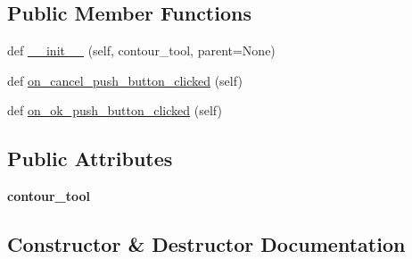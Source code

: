 \subsection*{Public Member Functions}
\begin{DoxyCompactItemize}
\item 
def \mbox{\hyperlink{class_dsg_tools_1_1_production_tools_1_1_contour_tool_1_1contour__value_1_1_contour_value_ad157500a621245f55daf8e2d532efc52}{\+\_\+\+\_\+init\+\_\+\+\_\+}} (self, contour\+\_\+tool, parent=None)
\item 
def \mbox{\hyperlink{class_dsg_tools_1_1_production_tools_1_1_contour_tool_1_1contour__value_1_1_contour_value_ad8b0c9cfb5607c331b648095639bc02a}{on\+\_\+cancel\+\_\+push\+\_\+button\+\_\+clicked}} (self)
\item 
def \mbox{\hyperlink{class_dsg_tools_1_1_production_tools_1_1_contour_tool_1_1contour__value_1_1_contour_value_aa36c4ebedb082e8c01aab94f2d762c2e}{on\+\_\+ok\+\_\+push\+\_\+button\+\_\+clicked}} (self)
\end{DoxyCompactItemize}
\subsection*{Public Attributes}
\begin{DoxyCompactItemize}
\item 
\mbox{\label{class_dsg_tools_1_1_production_tools_1_1_contour_tool_1_1contour__value_1_1_contour_value_a0bf1a3f1dd5d2b6deaac051ad1021c1d}} 
{\bfseries contour\+\_\+tool}
\end{DoxyCompactItemize}


\subsection{Constructor \& Destructor Documentation}
\mbox{\label{class_dsg_tools_1_1_production_tools_1_1_contour_tool_1_1contour__value_1_1_contour_value_ad157500a621245f55daf8e2d532efc52}} 
